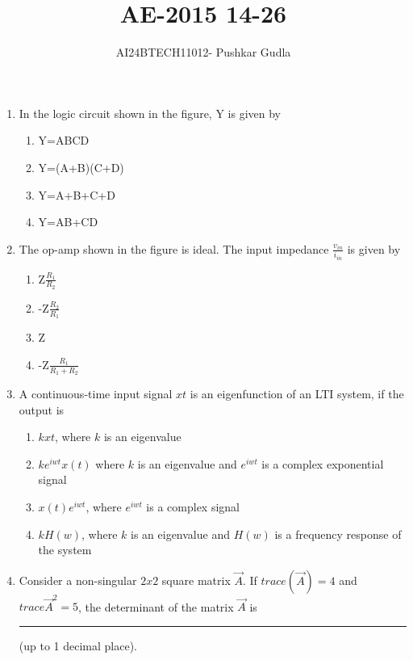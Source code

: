 \documentclass[journal,12pt,onecolumn]{IEEEtran}
\theoremstyle{remark}
\begin{document}

\vspace{3cm}

\title{\textbf{AE-2015 14-26}}
\author{AI24BTECH11012- Pushkar Gudla}
\maketitle
\bigskip

\renewcommand{\thefigure}{\theenumi}
\renewcommand{\thetable}{\theenumi}
\setlength{\columnsep}{2.5em}

\begin{enumerate}
    \item In the logic circuit shown in the figure, Y is given by
    
    \begin{enumerate}
    \item Y=ABCD
    \item Y=(A+B)(C+D)
    \item Y=A+B+C+D
    \item Y=AB+CD
    \end{enumerate}
    
    \item The op-amp shown in the figure is ideal. The input impedance $\frac{v_{in}}{i_{in}}$ is given by
    
    \begin{enumerate}
    \item Z$\frac{R_1}{R_2}$
    \item -Z$\frac{R_2}{R_1}$
    \item Z
    \item -Z$\frac{R_1}{R_1+R_2}$
    \end{enumerate}
    
    \item A continuous-time input signal $x{t}$ is an eigenfunction of an LTI system, if the output is
    \begin{enumerate}
    \item $kx{t}$, where $k$ is an eigenvalue
    \item $ke^{iwt}x(t)$ where $k$ is an eigenvalue and $e^{iwt}$ is a complex exponential signal
    \item $x(t)e^{iwt}$, where $e^{iwt}$ is a complex signal
    \item $kH(w)$, where $k$ is an eigenvalue and $H(w)$ is a frequency response of the system
    \end{enumerate}
    
    \item Consider a non-singular $2x2$ square matrix $\vec{A}$. If $trace(\vec{A})=4$ and $trace{\vec{A}^2}=5$, the determinant of the matrix $\vec{A}$ is \rule{2.5cm}{0.4pt}(up to 1 decimal place).
    

\end{enumerate}
\end{document}
